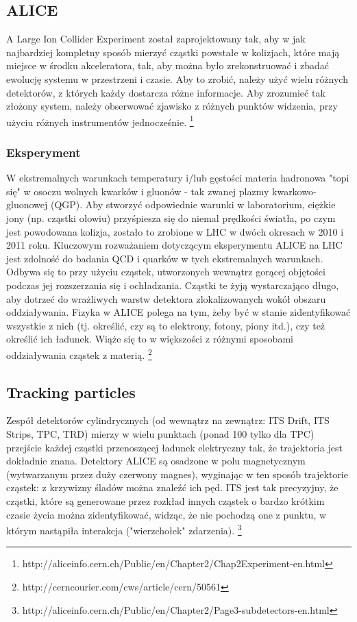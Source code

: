 \documentclass[paper=a4, fontsize=11pt]{scrartcl} %
\begin{document}
\subsection{ALICE}
A Large Ion Collider Experiment został zaprojektowany tak, aby w jak najbardziej kompletny sposób mierzyć cząstki powstałe w kolizjach, które mają miejsce w środku akceleratora, tak, aby można było zrekonstruować i zbadać ewolucję systemu w przestrzeni i czasie. Aby to zrobić, należy użyć wielu różnych detektorów, z których każdy dostarcza różne informacje. Aby zrozumieć tak złożony system, należy obserwować zjawisko z różnych punktów widzenia, przy użyciu różnych instrumentów jednocześnie. \footnote{http://aliceinfo.cern.ch/Public/en/Chapter2/Chap2Experiment-en.html}
\subsubsection{Eksperyment}
W ekstremalnych warunkach temperatury i/lub gęstości materia hadronowa "topi się" w osoczu wolnych kwarków i gluonów - tak zwanej plazmy kwarkowo-gluonowej (QGP). Aby stworzyć odpowiednie warunki w laboratorium, ciężkie jony (np. cząstki ołowiu) przyśpiesza się do niemal prędkości światła, po czym jest powodowana kolizja, zostało to zrobione w LHC w dwóch okresach w 2010 i 2011 roku. Kluczowym rozważaniem dotyczącym eksperymentu ALICE na LHC jest zdolność do badania QCD i quarków w tych ekstremalnych warunkach. Odbywa się to przy użyciu cząstek, utworzonych wewnątrz gorącej objętości podczas jej rozszerzania się i ochładzania. Cząstki te żyją wystarczająco długo, aby dotrzeć do wrażliwych warstw detektora zlokalizowanych wokół obszaru oddziaływania. Fizyka w ALICE polega na tym, żeby być w stanie zidentyfikować wszystkie z nich (tj. określić, czy są to elektrony, fotony, piony itd.), czy też określić ich ładunek. Wiąże się to w większości z różnymi sposobami oddziaływania cząstek z materią. \footnote{http://cerncourier.com/cws/article/cern/50561}
\subsection{Tracking particles}
Zespół detektorów cylindrycznych (od wewnątrz na zewnątrz: ITS Drift, ITS Strips, TPC, TRD) mierzy w wielu punktach (ponad 100 tylko dla TPC) przejście każdej cząstki przenoszącej ładunek elektryczny tak, że trajektoria jest dokładnie znana. Detektory ALICE są osadzone w polu magnetycznym (wytwarzanym przez duży czerwony magnes), wyginając w ten sposób trajektorie cząstek: z krzywizny śladów można znaleźć ich pęd. ITS jest tak precyzyjny, że cząstki, które są generowane przez rozkład innych cząstek o bardzo krótkim czasie życia można zidentyfikować, widząc, że nie pochodzą one z punktu, w którym nastąpiła interakcja ("wierzchołek" zdarzenia).
\footnote{http://aliceinfo.cern.ch/Public/en/Chapter2/Page3-subdetectors-en.html}
\newpage
\end{document}
